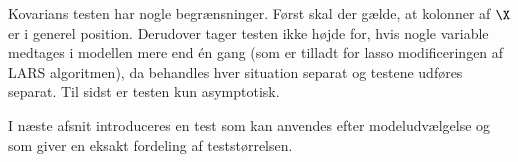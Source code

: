 

Kovarians testen har nogle begrænsninger.
Først skal der gælde, at kolonner af \(\X\) er i generel position.
Derudover tager testen ikke højde for, hvis nogle variable medtages i modellen mere end én gang (som er tilladt for lasso modificeringen af LARS algoritmen), da behandles hver situation separat og testene udføres separat.
Til sidst er testen kun asymptotisk.

I næste afsnit introduceres en test som kan anvendes efter modeludvælgelse og som giver en eksakt fordeling af teststørrelsen.